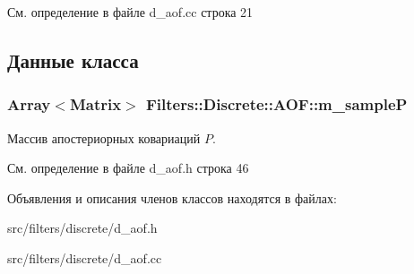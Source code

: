 См. определение в файле d\+\_\+aof.\+cc строка 21



\subsection{Данные класса}
\subsubsection[{\texorpdfstring{m\+\_\+sampleP}{m_sampleP}}]{\setlength{\rightskip}{0pt plus 5cm}Array$<$Matrix$>$ Filters\+::\+Discrete\+::\+A\+O\+F\+::m\+\_\+sampleP\hspace{0.3cm}{\ttfamily [protected]}}\hypertarget{class_filters_1_1_discrete_1_1_a_o_f_aef55ce0cf7129bb7090f8e470bcfbc1f}{}\label{class_filters_1_1_discrete_1_1_a_o_f_aef55ce0cf7129bb7090f8e470bcfbc1f}
Массив апостериорных ковариаций $P$. 

См. определение в файле d\+\_\+aof.\+h строка 46



Объявления и описания членов классов находятся в файлах\+:\begin{DoxyCompactItemize}
\item 
src/filters/discrete/d\+\_\+aof.\+h\item 
src/filters/discrete/d\+\_\+aof.\+cc\end{DoxyCompactItemize}
